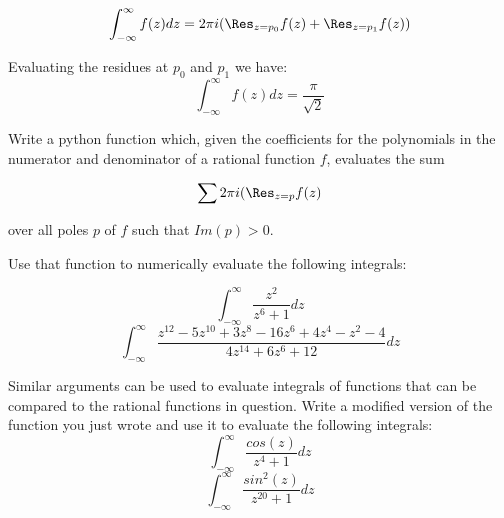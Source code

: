 \begin{equation*}
 \int_{-\infty}^{\infty} f(z) dz = 2\pi i (\Res_{z=p_0} f(z) +\Res_{z=p_1} f(z))
\end{equation*}

Evaluating the residues at $p_0$ and $p_1$ we have:
$$\int_{-\infty}^{\infty} f(z) dz = \frac{\pi}{\sqrt{2}}$$

\begin{problem}
Write a python function which, given the coefficients for the polynomials in the numerator and denominator of a rational function $f$, evaluates the sum

\begin{equation*}
\sum 2\pi i (\Res_{z=p} f(z)
\end{equation*}

over all poles $p$ of $f$ such that $Im(p)>0$.

Use that function to numerically evaluate the following integrals:

$$\int_{-\infty}^{\infty} \frac{z^2}{z^6+1}dz$$
$$\int_{-\infty}^{\infty} \frac{z^12-5z^10+3z^8-16z^6+4z^4-z^2-4}{4z^14+6z^6+12}dz$$

\end{problem}

\begin{problem}
Similar arguments can be used to evaluate integrals of functions that can be compared to the rational functions in question. Write a modified version of the function you just wrote and use it to evaluate the following integrals:
$$\int_{-\infty}^{\infty}\frac{cos(z)}{z^4+1}dz$$
$$\int_{-\infty}^{\infty}\frac{sin^2(z)}{z^20+1}dz$$
\end{problem}

